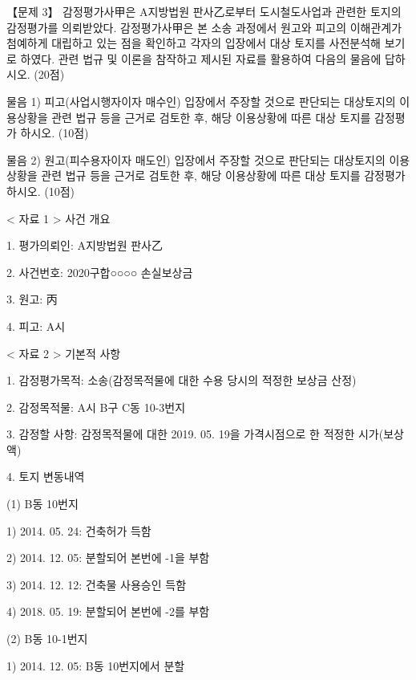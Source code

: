 \begin{longquestion}{【문제 3】}
감정평가사甲은 A지방법원 판사乙로부터 도시철도사업과 관련한 토지의 감정평가를 의뢰받았다. 감정평가사甲은 본 소송 과정에서 원고와 피고의 이해관계가 첨예하게 대립하고 있는 점을 확인하고 각자의 입장에서 대상 토지를 사전분석해 보기로 하였다. 관련 법규 및 이론을 참작하고 제시된 자료를 활용하여 다음의 물음에 답하시오. (20점) \par
\medskip\noindent 물음 1) 피고(사업시행자이자 매수인) 입장에서 주장할 것으로 판단되는 대상토지의 이용상황을 관련 법규 등을 근거로 검토한 후, 해당 이용상황에 따른 대상 토지를 감정평가 하시오. (10점) \par
\medskip\noindent 물음 2) 원고(피수용자이자 매도인) 입장에서 주장할 것으로 판단되는 대상토지의 이용상황을 관련 법규 등을 근거로 검토한 후, 해당 이용상황에 따른 대상 토지를 감정평가 하시오. (10점) \par
< 자료 1 > 사건 개요 \par
1. 평가의뢰인: A지방법원 판사乙 \par
2. 사건번호: 2020구합○○○○ 손실보상금 \par
3. 원고: 丙 \par
4. 피고: A시 \par
< 자료 2 > 기본적 사항 \par
1. 감정평가목적: 소송(감정목적물에 대한 수용 당시의 적정한 보상금 산정) \par
2. 감정목적물: A시 B구 C동 10-3번지 \par
3. 감정할 사항: 감정목적물에 대한 2019. 05. 19을 가격시점으로 한 적정한 시가(보상액) \par
4. 토지 변동내역 \par
\medskip\noindent (1) B동 10번지 \par
1) 2014. 05. 24: 건축허가 득함 \par
2) 2014. 12. 05: 분할되어 본번에 -1을 부함 \par
3) 2014. 12. 12: 건축물 사용승인 득함 \par
4) 2018. 05. 19: 분할되어 본번에 -2를 부함 \par
\medskip\noindent (2) B동 10-1번지 \par
1) 2014. 12. 05: B동 10번지에서 분할 \par

\end{longquestion}
